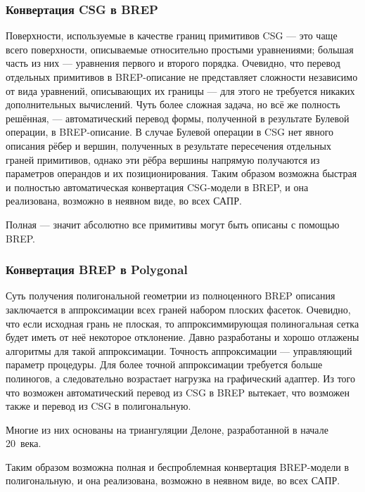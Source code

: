 \subsubsection{Конвертация CSG в BREP}\label{sec:secCSGtoBREP}

Поверхности, используемые в качестве границ примитивов CSG --- это чаще всего поверхности, описываемые относительно простыми уравнениями; большая часть из них --- уравнения первого и второго порядка. Очевидно, что перевод отдельных примитивов в BREP-описание не представляет сложности независимо от вида уравнений, описывающих их границы --- для этого не требуется никаких дополнительных вычислений. Чуть более сложная задача, но всё же полность решённая, --- автоматический перевод формы, полученной в результате Булевой операции, в BREP-описание. В случае Булевой операции в CSG нет явного описания рёбер и вершин, полученных в результате пересечения отдельных граней примитивов, однако эти рёбра вершины напрямую получаются из параметров операндов и их позиционирования. Таким образом возможна быстрая и полностью автоматическая конвертация CSG-модели в BREP, и она реализована, возможно в неявном виде, во всех САПР.

Полная --- значит абсолютно все примитивы могут быть описаны с помощью BREP.

\subsubsection{Конвертация BREP в Polygonal}\label{sec:secBREPtoPolygonal}

Суть получения полигональной геометрии из полноценного BREP описания заключается в аппроксимации всех граней набором плоских фасеток. Очевидно, что если исходная грань не плоская, то аппроксиммирующая полиногальная сетка будет иметь от неё некоторое отклонение.
Давно разработаны и хорошо отлажены алгоритмы для такой аппроксимации. Точность аппроксимации --- управляющий параметр процедуры. Для более точной аппроксимации требуется больше полиногов, а следовательно возрастает нагрузка на графический адаптер.
Из того что возможен автоматический перевод из CSG в BREP вытекает, что возможен также и перевод из CSG в полигональную.

Многие из них основаны на триангуляции Делоне, разработанной в начале 20~века.

Таким образом возможна полная и \todo беспроблемная \todo конвертация BREP-модели в полигональную, и она реализована, возможно в неявном виде, во всех САПР.

